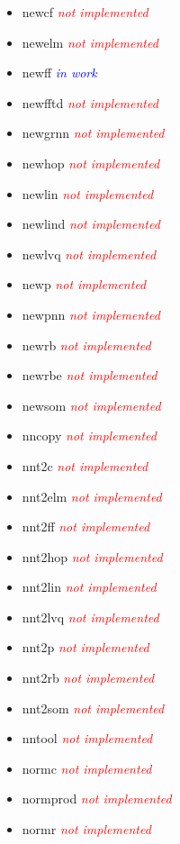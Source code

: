 \begin{itemize}
	\item newcf \textcolor{red}{\textit{not implemented}}
	\item newelm \textcolor{red}{\textit{not implemented}}
	\item newff \textcolor{blue}{\textit{in work}}
	\item newfftd \textcolor{red}{\textit{not implemented}}
	\item newgrnn \textcolor{red}{\textit{not implemented}}
	\item newhop \textcolor{red}{\textit{not implemented}}
	\item newlin \textcolor{red}{\textit{not implemented}}
	\item newlind \textcolor{red}{\textit{not implemented}}
	\item newlvq \textcolor{red}{\textit{not implemented}}
	\item newp \textcolor{red}{\textit{not implemented}}
	\item newpnn \textcolor{red}{\textit{not implemented}}
	\item newrb \textcolor{red}{\textit{not implemented}}
	\item newrbe \textcolor{red}{\textit{not implemented}}
	\item newsom \textcolor{red}{\textit{not implemented}}
	\item nncopy \textcolor{red}{\textit{not implemented}}
	\item nnt2c \textcolor{red}{\textit{not implemented}}
	\item nnt2elm \textcolor{red}{\textit{not implemented}}
	\item nnt2ff \textcolor{red}{\textit{not implemented}}
	\item nnt2hop \textcolor{red}{\textit{not implemented}}
	\item nnt2lin \textcolor{red}{\textit{not implemented}}
	\item nnt2lvq \textcolor{red}{\textit{not implemented}}
	\item nnt2p \textcolor{red}{\textit{not implemented}} 
	\item nnt2rb \textcolor{red}{\textit{not implemented}}
	\item nnt2som \textcolor{red}{\textit{not implemented}}
	\item nntool \textcolor{red}{\textit{not implemented}}
	\item normc \textcolor{red}{\textit{not implemented}}
	\item normprod \textcolor{red}{\textit{not implemented}}
	\item normr \textcolor{red}{\textit{not implemented}}

\end{itemize}
